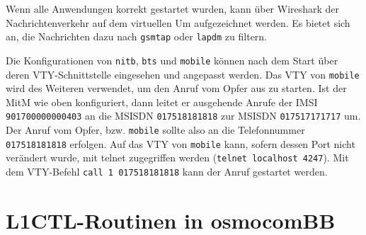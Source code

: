Wenn alle Anwendungen korrekt gestartet wurden, kann über Wireshark der Nachrichtenverkehr auf dem virtuellen \ac{Um} aufgezeichnet werden. Es bietet sich an, die Nachrichten dazu nach \texttt{gsmtap} oder \texttt{lapdm} zu filtern.

Die Konfigurationen von \texttt{nitb}, \texttt{bts} und \texttt{mobile} können nach dem Start über deren \ac{VTY}-Schnittstelle eingesehen und angepasst werden. Das \ac{VTY} von \texttt{mobile} wird des Weiteren verwendet, um den Anruf vom Opfer aus zu starten. Ist der \ac{MitM} wie oben konfiguriert, dann leitet er ausgehende Anrufe der \ac{IMSI} \texttt{901700000000403} an die \ac{MSISDN} \texttt{017518181818} zur \ac{MSISDN} \texttt{017517171717} um. Der Anruf vom Opfer, bzw. \texttt{mobile} sollte also an die Telefonnummer \texttt{017518181818} erfolgen. Auf das \ac{VTY} von \texttt{mobile} kann, sofern dessen Port nicht verändert wurde, mit telnet zugegriffen werden (\texttt{telnet localhost 4247}). Mit dem \ac{VTY}-Befehl \texttt{call 1 017518181818} kann der Anruf gestartet werden.

\section{L1CTL-Routinen in osmocomBB}\label{hdl:a_l1ctl-routines}

